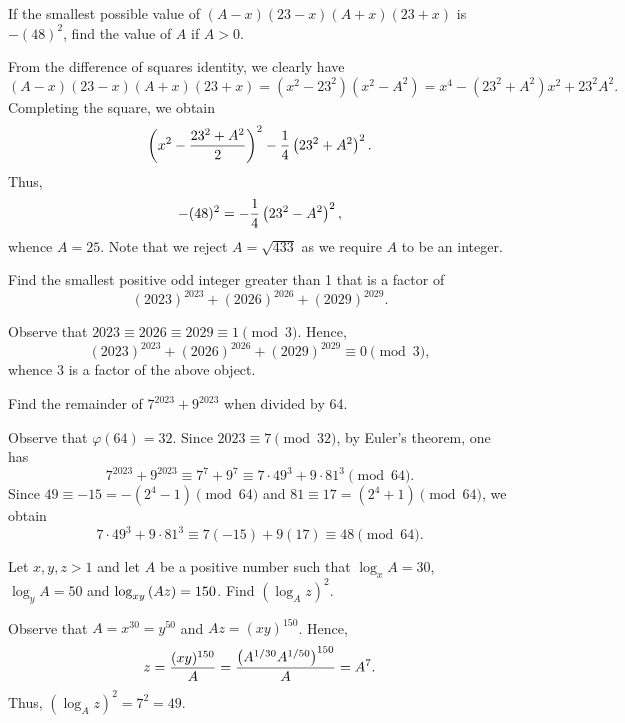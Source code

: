 \begin{question}[25]\label{Q::2023-S-1-7}
    If the smallest possible value of $(A-x)(23-x)(A+x)(23+x)$ is $-(48)^2$, find the value of $A$ if $A > 0$.
\end{question}
\begin{solution*}
    From the difference of squares identity, we clearly have \[(A-x)(23-x)(A+x)(23+x) = (x^2 - 23^2)(x^2 - A^2) = x^4 - (23^2 + A^2)x^2 + 23^2 A^2.\] Completing the square, we obtain \[\left( x^2 - \frac{23^2 + A^2}{2} \right)^2 - \frac14 \left(  23^2 + A^2 \right)^2.\] Thus, \[-(48)^2 = - \frac14 \left( 23^2 - A^2 \right)^2,\] whence $A = 25$. Note that we reject $A = \sqrt{433}$ as we require $A$ to be an integer.
\end{solution*}

\begin{question}[3]\label{Q::2023-S-1-8}
    Find the smallest positive odd integer greater than 1 that is a factor of \[(2023)^{2023} + (2026)^{2026} + (2029)^{2029}.\]
\end{question}
\begin{solution*}
    Observe that $2023 \equiv 2026 \equiv 2029 \equiv 1 \pmod{3}$. Hence, \[(2023)^{2023} + (2026)^{2026} + (2029)^{2029} \equiv 0 \pmod{3},\] whence 3 is a factor of the above object.
\end{solution*}

\begin{question}[48]\label{Q::2023-S-1-9}
    Find the remainder of $7^{2023} + 9^{2023}$ when divided by 64.
\end{question}
\begin{solution*}
    Observe that $\varphi(64) = 32$. Since $2023 \equiv 7 \pmod{32}$, by Euler's theorem, one has \[7^{2023} + 9^{2023} \equiv 7^7 + 9^7 \equiv 7 \cdot 49^3 + 9 \cdot 81^3 \pmod{64}.\] Since $49 \equiv -15 = -(2^4 - 1) \pmod{64}$ and $81 \equiv 17 = (2^4 + 1) \pmod{64}$, we obtain \[7 \cdot 49^3 + 9 \cdot 81^3 \equiv 7(-15) + 9(17) \equiv 48 \pmod{64}.\]
\end{solution*}

\begin{question}[49]\label{Q::2023-S-1-10}
    Let $x, y, z > 1$ and let $A$ be a positive number such that $\log_x A = 30$, $\log_y A = 50$ and $\log_{xy}\left( Az \right) = 150$. Find $(\log_A z)^2$.
\end{question}
\begin{solution*}
    Observe that $A = x^{30} = y^{50}$ and $Az = (xy)^{150}$. Hence, \[z = \frac{(xy)^{150}}{A} = \frac{\left( A^{1/30} A^{1/50} \right)^{150}}{A} = A^7.\] Thus, $(\log_A z)^2 = 7^2 = 49$.
\end{solution*}

